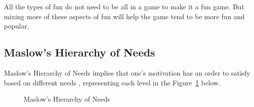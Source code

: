\documentclass[12pt,oneside,openright,a4paper]{cpe-english-project}
\begin{document}
All the types of fun do not need to be all in a game to make it a fun game. But mixing more of these aspects of fun will help the game tend to be more fun and popular.

\subsection{Maslow's Hierarchy of Needs}
Maslow's Hierarchy of Needs implies that one's motivation has an order to satisfy based on different needs \cite{saul2022simplypsychology}, representing each level in the Figure~\ref{fig:theory-maslow-needs} below.

\begin{figure}[!h]\centering
{}
\caption{Maslow's Hierarchy of Needs}
\label{fig:theory-maslow-needs}
\end{figure}
\end{document}

